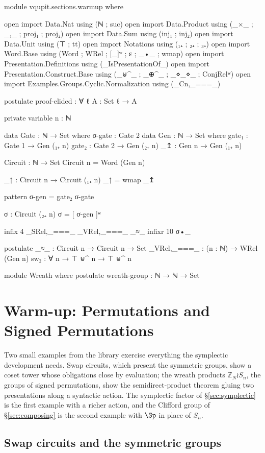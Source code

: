 \begin{code}[hide]
module vqupit.sections.warmup where

open import Data.Nat using (ℕ ; suc)
open import Data.Product using (_×_ ; _,_ ; proj₁ ; proj₂)
open import Data.Sum using (inj₁ ; inj₂)
open import Data.Unit using (⊤ ; tt)
open import Notations using (₁₊ ; ₂₊ ; ₃₊)
open import Word.Base using (Word ; WRel ; [_]ʷ ; ε ; _•_ ; wmap)
open import Presentation.Definitions using (_IsPresentationOf_)
open import Presentation.Construct.Base using (_⊎^_ ; _⊕^_ ; _⋄_⋄_ ; ConjRelʷ)
open import Examples.Groups.Cyclic.Normalization using (_Cn,_===_)

postulate
  proof-elided : ∀ {ℓ} {A : Set ℓ} → A

private variable
  n : ℕ

data Gate : ℕ → Set where
  σ-gate : Gate 2
data Gen : ℕ → Set where
  gate₁ : Gate 1 → Gen (₁₊ n)
  gate₂ : Gate 2 → Gen (₂₊ n)
  _↥   : Gen n → Gen (₁₊ n)

Circuit : ℕ → Set
Circuit n = Word (Gen n)

_↑ : Circuit n → Circuit (₁₊ n)
_↑ = wmap _↥

pattern σ-gen = gate₂ σ-gate

σ : Circuit (₂₊ n)
σ = [ σ-gen ]ʷ

infix 4 _SRel,_===_ _VRel,_===_ _≈_
infixr 10 σ•_

postulate
  _≈_ : Circuit n → Circuit n → Set
  _VRel,_===_ : (n : ℕ) → WRel (Gen n)
  sw₂ : ∀ {n} → ⊤ ⊎^ n → ⊤ ⊎^ n

module Wreath where
  postulate wreath-group : ℕ → ℕ → Set
\end{code}
\section{Warm-up: Permutations and Signed Permutations}\label{sec:warmup}

Two small examples from the library exercise everything the symplectic
development needs.  Swap circuits, which present the symmetric groups,
show a coset tower whose obligations close by evaluation; the wreath
products $\mathbb{Z}_N \wr S_n$, the groups of signed permutations, show
the semidirect-product theorem gluing two presentations along a
syntactic action.  The symplectic factor of \S\ref{sec:symplectic} is
the first example with a richer action, and the Clifford group of
\S\ref{sec:composing} is the second example with $\Sp$ in place of
$S_n$.

\subsection{Swap circuits and the symmetric groups}\label{sec:sn}

